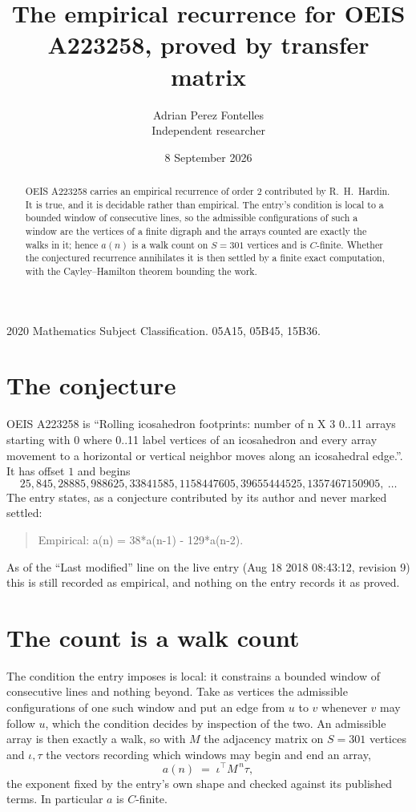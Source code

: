 \documentclass[11pt,a4paper]{article}
\title{The empirical recurrence for OEIS A223258, proved by transfer matrix}
\author{Adrian Perez Fontelles\\ \small Independent researcher}
\date{8 September 2026}
\theoremstyle{plain}
\theoremstyle{definition}
\begin{document}
\maketitle

\begin{abstract}
OEIS A223258 carries an empirical recurrence of order $2$ contributed by R.~H.~Hardin. It is
true, and it is decidable rather than empirical. The entry's condition is local to a bounded window of consecutive lines, so
the admissible configurations of such a window are the vertices of a finite digraph and the
arrays counted are exactly the walks in it; hence $a(n)$ is a walk count on $S=301$ vertices
and is $C$-finite. Whether the conjectured recurrence annihilates it is then settled by a
finite exact computation, with the Cayley--Hamilton theorem bounding the work.
\end{abstract}

\noindent\small 2020 Mathematics Subject Classification. 05A15, 05B45, 15B36.\normalsize

\section{The conjecture}

OEIS A223258 is ``Rolling icosahedron footprints: number of n X 3 0..11 arrays starting with 0 where 0..11 label vertices of an icosahedron and every array movement to a horizontal or vertical neighbor moves along an icosahedral edge.''. It has offset $1$ and begins
\[
25, 845, 28885, 988625, 33841585, 1158447605, 39655444525, 1357467150905,\ \dots
\]
The entry states, as a conjecture contributed by its author and never marked settled:
\begin{quote}
Empirical: a(n) = 38*a(n-1) - 129*a(n-2).
\end{quote}
As of the ``Last modified'' line on the live entry (Aug 18 2018 08:43:12, revision 9) this is still
recorded as empirical, and nothing on the entry records it as proved.

\section{The count is a walk count}

The condition the entry imposes is local: it constrains a bounded window of consecutive lines and nothing beyond. Take as
vertices the admissible configurations of one such window and put an edge from $u$ to $v$
whenever $v$ may follow $u$, which the condition decides by inspection of the two. An
admissible array is then exactly a walk, so with $M$ the adjacency matrix on $S=301$ vertices
and $\iota,\tau$ the vectors recording which windows may begin and end an array,
\[
a(n)\;=\;\iota^{\!\top}M^{\,n}\tau ,
\]
the exponent fixed by the entry's own shape and checked against its published terms. In
particular $a$ is $C$-finite.
\end{document}
